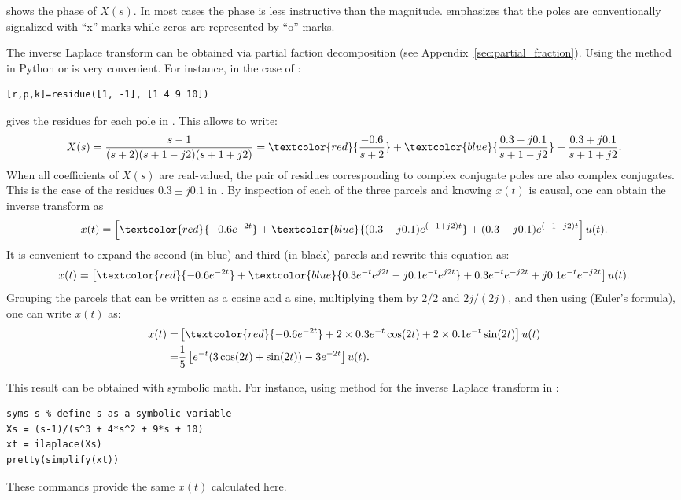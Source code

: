  shows the phase of $X(s)$. In most cases the phase is less instructive than the magnitude.  emphasizes that the poles are conventionally signalized with ``x'' marks while zeros are represented by ``o'' marks.

The inverse Laplace transform can be obtained via partial faction decomposition (see Appendix~\ref{sec:partial_fraction}). Using the method  in Python or {\matlab} is very convenient. For instance, in the case of {\matlab}:
\begin{lstlisting}
[r,p,k]=residue([1, -1], [1 4 9 10])
\end{lstlisting}
gives the residues  for each pole in . This allows to write:
\begin{equation}
X(s) =  \frac{s-1}{(s+2)(s+1-j2)(s+1+j2)} = \textcolor{red}{\frac{-0.6}{s+2}} + \textcolor{blue}{\frac{0.3-j0.1}{s+1-j2}} + \frac{0.3+j0.1}{s+1+j2}.
\label{eq:complex_residues}
\end{equation}
When all coefficients of $X(s)$ are real-valued, the pair of residues corresponding to complex conjugate poles are also complex conjugates.
This is the case of the residues $0.3 \pm j0.1$ in .
By inspection of each of the three parcels and knowing $x(t)$ is causal, one can obtain the inverse transform as
\[
x(t) = \left[ \textcolor{red}{-0.6 e^{-2t}} +  \textcolor{blue}{(0.3-j0.1)e^{(-1+j2)t}} +  (0.3+j0.1)e^{(-1-j2)t} \right] u(t).
\]
It is convenient to expand the second (in blue) and third (in black) parcels and rewrite this equation as:
\[
x(t) = \left[ \textcolor{red}{-0.6 e^{-2t}} + \textcolor{blue}{0.3e^{-t} e^{j2t} - j0.1e^{-t} e^{j2t}} + 0.3e^{-t} e^{-j2t} + j0.1e^{-t} e^{-j2t}
 \right] u(t).
\]
Grouping the parcels that can be written as a cosine and a sine, multiplying them by $2/2$ and $2j/(2j)$, and then using  (Euler's formula), one can write $x(t)$ as:
\begin{align*}
x(t) = & \left[ \textcolor{red}{-0.6 e^{-2t}} + 2 \times 0.3e^{-t} \cos(2t) + 2 \times 0.1e^{-t} \sin(2t) \right] u(t) \\
 = & \frac{1}{5} \left[e^{-t} (3 \cos(2 t) + \sin(2 t)) - 3 e^{-2 t} \right] u(t).
\end{align*}

This result can be obtained with symbolic math. For instance, using method  for the inverse Laplace transform in {\matlab}:
\begin{lstlisting}
syms s % define s as a symbolic variable
Xs = (s-1)/(s^3 + 4*s^2 + 9*s + 10) 
xt = ilaplace(Xs)
pretty(simplify(xt))
\end{lstlisting}
These commands provide the same $x(t)$ calculated here.
\eExample 

